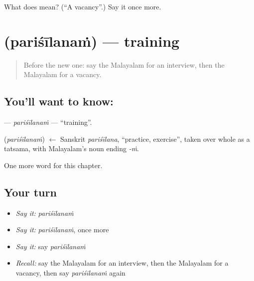 \begin{tcolorbox}[breakable,colback=teal!4,colframe=teal!35!black,title={Before you move on}]
What does  mean? (\textquotedblleft{}A vacancy\textquotedblright{}.) Say it once more.
\end{tcolorbox}
\section[\texorpdfstring{\ml{പരിശീലനം} (pariśīlanaṁ)}{പരിശീലനം (pariśīlanaṁ)}]{ (pariśīlanaṁ) — training}

\label{lesson:ML-C261-parisilanam}



\begin{quote}
Before the new one: say the Malayalam for an interview, then the Malayalam for a vacancy.
\end{quote}

\subsection*{You'll want to know: }
\textbf{} — \emph{pariśīlanaṁ} — \textquotedblleft{}training\textquotedblright{}.

\begin{cousinweb}
\textbf{} (\emph{pariśīlanaṁ}) $\leftarrow$ Sanskrit \emph{pariśīlana}, \textquotedblleft{}practice, exercise\textquotedblright{}, taken over whole as a tatsama, with Malayalam's noun ending \emph{-ṁ}.
\end{cousinweb}

\begin{grammarlens}[title={What you've built}]
One more word for this chapter.
\end{grammarlens}

\subsection*{Your turn}
\begin{itemize}
\raggedright
  \item \emph{Say it:} \emph{pariśīlanaṁ}
  \item \emph{Say it:} \emph{pariśīlanaṁ}, once more
  \item \emph{Say it:} say \emph{pariśīlanaṁ}
  \item \emph{Recall:} say the Malayalam for an interview, then the Malayalam for a vacancy, then say \emph{pariśīlanaṁ} again
\end{itemize}

